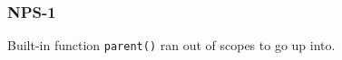 \subsubsection{NPS-1}\label{sec:error_code_nps_1}

Built-in function \texttt{parent()} ran out of scopes to go up into.


